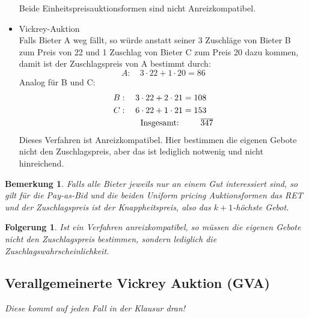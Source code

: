 \documentclass[12pt]{extreport} %
\theoremstyle{named}
\theoremstyle{itshape}
\theoremstyle{normal}
\newtheorem*{bemerkung}{Bemerkung}
\newtheorem*{folgerung*}{Folgerung}
\begin{document}
\begin{itemize}
\begin{itemize}
\begin{itemize}
				\end{itemize}
		\end{itemize} 
		Beide Einheitspreisauktionsformen sind nicht Anreizkompatibel.
	\item Vickrey-Auktion ~\\
		Falls Bieter A weg fällt, so würde anstatt seiner 3 Zuschläge von Bieter B zum Preis von 22 und 1 Zuschlag von  Bieter C zum Preis 20 dazu kommen, damit ist der Zuschlagspreis von A bestimmt durch:
		$$ A: \quad 3 \cdot 22 + 1 \cdot 20 = 86 $$
		Analog für B und C:
		\begin{align*}
			B: \quad 3 \cdot 22 + 2 \cdot 21 & = 108 \\
			C: \quad 6 \cdot 22 + 1 \cdot 21 & = 153 \\
			\text{ Insgesamt: } & \hspace{0.75cm} \overline{347}
		\end{align*}
		Dieses Verfahren ist Anreizkompatibel. Hier bestimmen die eigenen Gebote nicht den Zuschlagspreis, aber das ist lediglich notwenig und nicht hinreichend.
\end{itemize}

\begin{bemerkung}
	Falls alle Bieter jeweils nur an einem Gut interessiert sind, so gilt für die Pay-as-Bid und die beiden Uniform pricing Auktionsformen das RET und der Zuschlagspreis ist der Knappheitspreis, also das $k+1$-höchste Gebot.
\end{bemerkung}

\begin{folgerung*}
	Ist ein Verfahren anreizkompatibel, so müssen die eigenen Gebote nicht den Zuschlagspreis bestimmen, sondern lediglich die Zuschlagswahrscheinlichkeit.
\end{folgerung*}

\subsection{Verallgemeinerte Vickrey Auktion (GVA)}  


\textit{Diese kommt auf jeden Fall in der Klausur dran!} %
\end{document}
